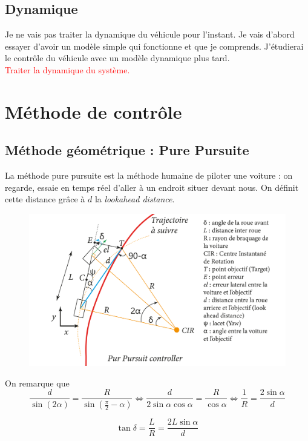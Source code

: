 \documentclass[a4paper,12pt]{extarticle}
\begin{document}
\subsection{Dynamique}
Je ne vais pas traiter la dynamique du véhicule pour l’instant. Je vais d’abord essayer d’avoir un modèle simple qui fonctionne et que je comprends. J’étudierai le contrôle du véhicule avec un modèle dynamique plus tard.\\
\textcolor{red}{Traiter la dynamique du système.}


\section{Méthode de contrôle}
\subsection{Méthode géométrique : Pure Pursuite}
La méthode pure pursuite est la méthode humaine de piloter une voiture : on regarde, essaie en temps réel d'aller à un endroit situer devant nous. On définit cette distance grâce à $d$ la \emph{lookahead distance}.

\begin{figure}[h!]
    \centering
    \includegraphics[width=1\textwidth]{image/Pure_pursuite.png}\\
\end{figure}

On remarque que 
\begin{equation*}
    \frac{d}{\sin(2\alpha)} = \frac{R}{\sin(\frac{\pi}{2}-\alpha)} 
    \iff
    \frac{d}{2\sin\alpha\cos\alpha} = \frac{R}{\cos\alpha}
    \iff
    \frac{1}{R} = \frac{2\sin\alpha}{d}
\end{equation*}

\begin{equation*}
    \tan\delta = \frac{L}{R} = \frac{2L\sin\alpha}{d}
\end{equation*}
\end{document}
